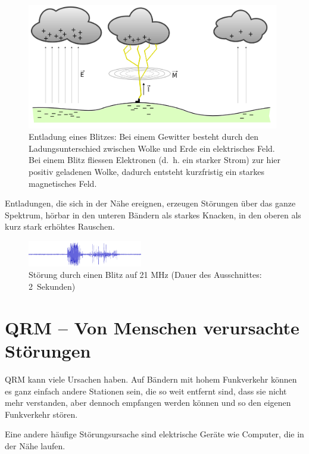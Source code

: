 \begin{figure}[h!]
 \centering
 \includegraphics[width=11cm]{./png/Amfu-Blitz.png}
 \caption{Entladung eines Blitzes: Bei einem Gewitter besteht durch den Ladungsunterschied zwischen Wolke und Erde ein elektrisches Feld. Bei einem Blitz fliessen Elektronen (d. h. ein starker Strom) zur hier positiv geladenen Wolke, dadurch entsteht kurzfristig ein starkes magnetisches Feld.}
 \label{fig:blitz}
\end{figure}


Entladungen, die sich in der Nähe ereignen, erzeugen Störungen über das ganze Spektrum, hörbar in den unteren Bändern als starkes Knacken, in den oberen als kurz stark erhöhtes Rauschen.

\begin{figure}[h!]
 \centering
 \includegraphics[width=5cm]{./png/Blitz-20M.png}
 \caption{Störung durch einen Blitz auf 21 MHz (Dauer des Ausschnittes: 2 Sekunden)}
 \label{fig:flash20}
\end{figure}


\section{QRM – Von Menschen verursachte Störungen}
QRM kann viele Ursachen haben. Auf Bändern mit hohem Funkverkehr können es ganz einfach andere Stationen sein, die so weit entfernt sind, dass sie nicht mehr verstanden, aber dennoch empfangen werden können und so den eigenen Funkverkehr stören. 

Eine andere häufige Störungsursache sind elektrische Geräte wie Computer, die in der Nähe laufen.



